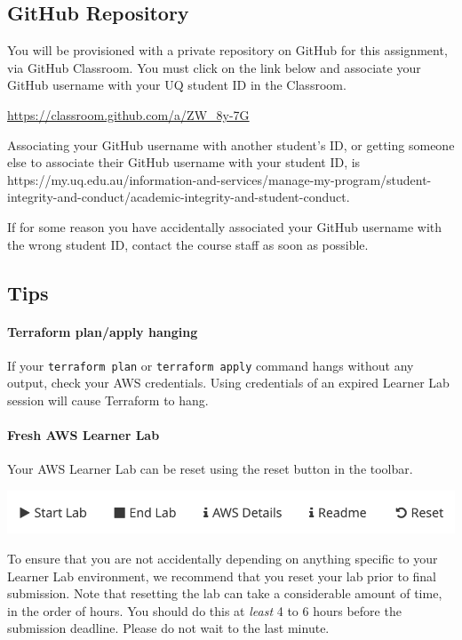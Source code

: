 \documentclass{csse4400}
\begin{document}
\subsection{GitHub Repository}\label{sec:github}
You will be provisioned with a private repository on GitHub for this assignment, via GitHub Classroom. You must click on the link below and associate your GitHub username with your UQ student ID in the Classroom.

\url{https://classroom.github.com/a/ZW_8y-7G}

\noindent
Associating your GitHub username with another student's ID, or getting someone else to associate their GitHub username with your student ID, is  {https://my.uq.edu.au/information-and-services/manage-my-program/student-integrity-and-conduct/academic-integrity-and-student-conduct}.

If for some reason you have accidentally associated your GitHub username with the wrong student ID, contact the course staff as soon as possible.

\subsection{Tips}

\paragraph{Terraform plan/apply hanging}
If your \texttt{terraform plan} or \texttt{terraform apply} command hangs without any output, check your AWS credentials. Using credentials of an expired Learner Lab session will cause Terraform to hang.

\paragraph{Fresh AWS Learner Lab}
Your AWS Learner Lab can be reset using the reset button in the toolbar.

\noindent
\includegraphics[width=\textwidth]{images/reset-button.png}

\noindent
To ensure that you are not accidentally depending on anything specific to your Learner Lab environment, we recommend that you reset your lab prior to final submission. Note that resetting the lab can take a considerable amount of time, in the order of hours. You should do this at \textit{least} 4 to 6 hours before the submission deadline. Please do not wait to the last minute.
\end{document}

